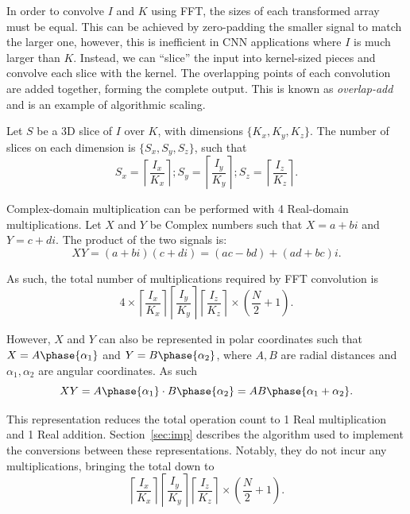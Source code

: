 \documentclass[
  10pt,
  \FORMAT-MODE,
  \REVIEW-MODE,
  \TWOSIDE-MODE
]{IEEEtran}
\begin{document}
    In order to convolve $I$ and $K$ using FFT, the sizes of each transformed array must be equal. This can be achieved by zero-padding the smaller signal to match the larger one, however, this is inefficient in CNN applications where $I$ is much larger than $K$. Instead, we can ``slice'' the input into kernel-sized pieces and convolve each slice with the kernel. The overlapping points of each convolution are added together, forming the complete output. This is known as \textit{overlap-add}~\cite{smith1997scientist,chen2024fast} and is an example of algorithmic scaling.

    Let $S$ be a 3D slice of $I$ over $K$, with dimensions $\{K_x,K_y,K_z\}$. The number of slices on each dimension is $\{S_x,S_y,S_z\}$, such that
    \begin{equation}
      S_{x} = \left\lceil\frac{I_x}{K_x}\right\rceil;
      S_{y} = \left\lceil\frac{I_y}{K_y}\right\rceil;
      S_{z} = \left\lceil\frac{I_z}{K_z}\right\rceil.
    \end{equation}

    Complex-domain multiplication can be performed with 4 Real-domain multiplications. Let $X$ and $Y$ be Complex numbers such that $X=a+bi$ and $Y=c+di$. The product of the two signals is:
    \begin{equation}\label{eq:cmul-rect}
      XY = (a+bi)(c+di) = (ac-bd) + (ad+bc)i.
    \end{equation}

    As such, the total number of multiplications required by FFT convolution is
    \begin{equation}\label{eq:fconv-mul1}
      4{\times}
      \left\lceil\frac{I_x}{K_x}\right\rceil
      \left\lceil\frac{I_y}{K_y}\right\rceil
      \left\lceil\frac{I_z}{K_z}\right\rceil
      {\times} \left(\frac{N}{2}+1\right).
    \end{equation}

    However, $X$ and $Y$ can also be represented in polar coordinates such that $X=A\phase{\alpha_1}$ and $Y=B\phase{\alpha_2}$, where $A,B$ are radial distances and $\alpha_1,\alpha_2$ are angular coordinates. As such
    \begin{equation}\label{eq:cmul-pol}
      XY = A\phase{\alpha_1} \cdot B\phase{\alpha_2} = AB\phase{\alpha_1+\alpha_2}.
    \end{equation}

    This representation reduces the total operation count to 1 Real multiplication and 1 Real addition. Section~\ref{sec:imp} describes the algorithm used to implement the conversions between these representations. Notably, they do not incur any multiplications, bringing the total down to
    \begin{equation}\label{eq:fconv-mul2}
      \left\lceil\frac{I_x}{K_x}\right\rceil
      \left\lceil\frac{I_y}{K_y}\right\rceil
      \left\lceil\frac{I_z}{K_z}\right\rceil
      {\times} \left(\frac{N}{2}+1\right).
    \end{equation}
\end{document}
